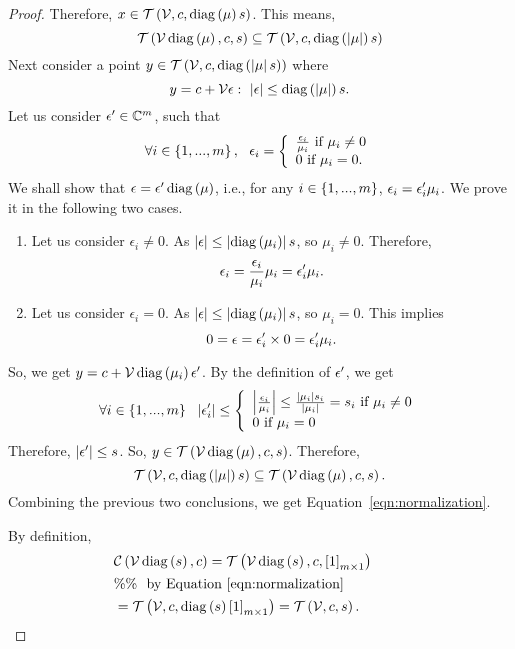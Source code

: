 \begin{proof}
Therefore, ${x\in\mathit{\operatorname{\mathcal{T}}}\left(\mathcal{V},c,\operatorname{diag}\left(\mu\right)s\right)}$.  This
means,
%
\[
\mathit{\operatorname{\mathcal{T}}}\left(\mathcal{V}\operatorname{diag}\left(\mu\right),c,s\right)\subseteq\mathit{\operatorname{\mathcal{T}}}\left(\mathcal{V},c,\operatorname{diag}\left(\left|\mu\right|\right)s\right)
\]
%
Next consider a point
$y\in\mathit{\operatorname{\mathcal{T}}}\left(\mathcal{V},c,\operatorname{diag}\left(\left|\mu\right|s\right)\right)$ where
%
\[
y=c+\mathcal{V}\epsilon:~\left|\epsilon\right|\leq
\operatorname{diag}\left(\left|\mu\right|\right)s.
\]
%
Let us consider $\epsilon^\prime\in\mathbb{C}^m$, such that
%
\[\forall i\in\left\{1,...,m\right\},~~
\epsilon_i=\left\{
\begin{array}{l}
\frac{\epsilon_i}{\mu_i}~\text{if}~\mu_i\neq 0\\
0~\text{if}~\mu_i=0.
\end{array}
\right.
\]
%
We shall show that $\epsilon=\epsilon^\prime\operatorname{diag}\left(\mu\right)$, i.e., for
any $i\in\left\{1,...,m\right\}$, $\epsilon_i=\epsilon^\prime_i\mu_i$.  We prove
it in the following two cases.
\begin{enumerate}
\item Let us consider $\epsilon_i\neq 0$.  As
$\left|\epsilon\right|\leq\left|\operatorname{diag}\left(\mu_i\right)\right|s$, so
  $\mu_i\neq 0$.  Therefore,
  \[
  \epsilon_i=\frac{\epsilon_i}{\mu_i}\mu_i=\epsilon^\prime_i\mu_i.
  \]
\item Let us consider $\epsilon_i=0$.  As
$\left|\epsilon\right|\leq\left|\operatorname{diag}\left(\mu_i\right)\right|s$, so $\mu_i=
  0$.  This implies
  \[
  0=\epsilon=\epsilon^\prime_i\times
  0=\epsilon^\prime_i\mu_i.
  \]
\end{enumerate}
%
So, we get $y=c+\mathcal{V}\operatorname{diag}\left(\mu_i\right)\epsilon^\prime$.  By the definition of
$\epsilon^\prime$, we get
%
\[\forall i\in\left\{1,...,m\right\}~~
\left|\epsilon^\prime_i\right|\leq
\left\{
\begin{array}{l}
\left|\frac{\epsilon_i}{\mu_i}\right|\leq\frac{\left|\mu_i\right|s_i}{\left|\mu_i\right|}=s_i~\text{if}~\mu_i\neq
0\\
0~\text{if}~\mu_i=0
\end{array}
\right.
\]
%
Therefore, $\left|\epsilon^\prime\right|\leq s$.  So,
$y\in\mathit{\operatorname{\mathcal{T}}}\left(\mathcal{V}\operatorname{diag}\left(\mu\right),c,s\right)$.  Therefore,
%
\[
\mathit{\operatorname{\mathcal{T}}}\left(\mathcal{V},c,\operatorname{diag}\left(\left|\mu\right|\right)s\right)\subseteq\mathit{\operatorname{\mathcal{T}}}\left(\mathcal{V}\operatorname{diag}\left(\mu\right),c,s\right).
\]
%
Combining the previous two conclusions, we get
Equation~\ref{eqn:normalization}.

By definition,
%
\begin{align*}
& \mathit{\mathcal{C}}\left(\mathcal{V}\operatorname{diag}\left(s\right),c\right)=\mathit{\operatorname{\mathcal{T}}}\left(\mathcal{V}\operatorname{diag}\left(s\right),c,\left[1\right]_{m\times 1}\right)\\
& \%\%~~\text{by Equation~\ref{eqn:normalization}}\\
& =\mathit{\operatorname{\mathcal{T}}}\left(\mathcal{V},c,\operatorname{diag}\left({s}\right)\left[1\right]_{m\times 1}\right)=\mathit{\operatorname{\mathcal{T}}}\left(\mathcal{V},c,s\right).~\hspace{3em}\qedhere
\end{align*}
%
\end{proof}
%
